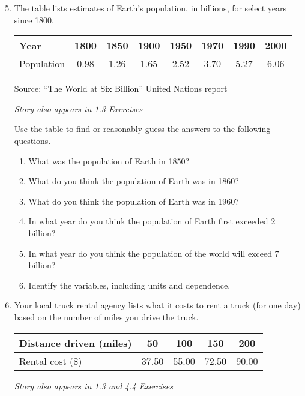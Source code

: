 \begin{enumerate} 
\setcounter{enumi}{4}

\item The table lists estimates of Earth's population, in billions, for select years since 1800.   
\begin{center}
\begin{tabular} {|l ||c |c |c |c |c |c |c |} \hline
Year & 1800 & 1850 & 1900 & 1950 & 1970 & 1990 & 2000 \\ \hline
Population & 0.98 & 1.26 & 1.65 & 2.52 & 3.70 & 5.27 & 6.06  \\ \hline
\end{tabular}
\end{center}
\hfill \begin{footnotesize} Source:  ``The World at Six Billion'' United Nations report\end{footnotesize}

 \hfill \emph{Story also appears in 1.3 Exercises}
 
Use the table to find or reasonably guess the answers to the following questions.
\begin{enumerate}
\item What was the population of Earth in 1850?
\item What do you think the population of Earth was in 1860?
\item What do you think the population of Earth was in 1960?
\item In what year do you think the population of Earth first exceeded 2 billion?
\item In what year do you think the population of the world will exceed 7 billion?
\item Identify the variables, including units and dependence.
\end{enumerate}  

\item Your local truck rental agency lists what it costs to rent a truck (for one day) based on the number of miles you drive the truck.
\begin{center}
\begin{tabular} {|l ||c |c|c|c|} \hline
Distance driven (miles) & 50 & 100 & 150 & 200 \\ \hline
Rental cost (\$) & 37.50 & 55.00 & 72.50 & 90.00 \\ \hline
\end{tabular}
\end{center}
 \hfill \emph{Story also appears in 1.3 and 4.4 Exercises}
 

\end{enumerate}
